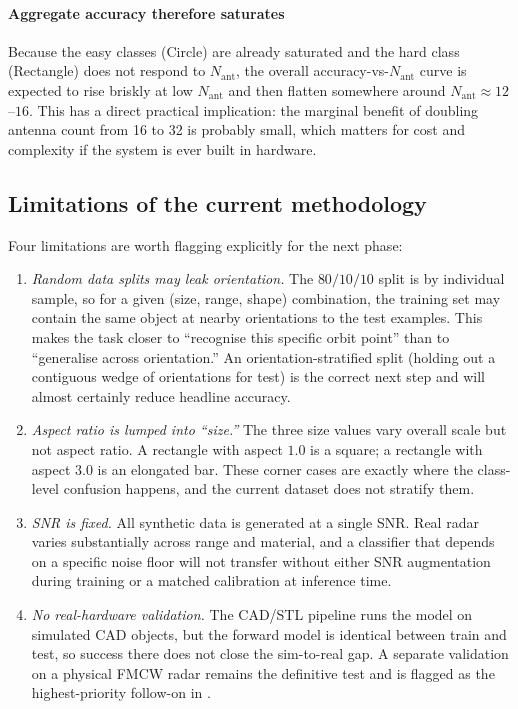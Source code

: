 \documentclass[letterpaper,11pt,leqno]{article}
\begin{document}
\paragraph{Aggregate accuracy therefore saturates} Because the easy classes (Circle) are already saturated and the hard class (Rectangle) does not respond to $N_{\mathrm{ant}}$, the overall accuracy-vs-$N_{\mathrm{ant}}$ curve is expected to rise briskly at low $N_{\mathrm{ant}}$ and then flatten somewhere around $N_{\mathrm{ant}}\approx 12$--$16$. This has a direct practical implication: the marginal benefit of doubling antenna count from 16 to 32 is probably small, which matters for cost and complexity if the system is ever built in hardware.

\subsection{Limitations of the current methodology}

Four limitations are worth flagging explicitly for the next phase:

\begin{enumerate}
\item \emph{Random data splits may leak orientation.} The $80/10/10$ split is by individual sample, so for a given (size, range, shape) combination, the training set may contain the same object at nearby orientations to the test examples. This makes the task closer to ``recognise this specific orbit point'' than to ``generalise across orientation.'' An orientation-stratified split (holding out a contiguous wedge of orientations for test) is the correct next step and will almost certainly reduce headline accuracy.
\item \emph{Aspect ratio is lumped into ``size.''} The three size values vary overall scale but not aspect ratio. A rectangle with aspect $1.0$ is a square; a rectangle with aspect $3.0$ is an elongated bar. These corner cases are exactly where the class-level confusion happens, and the current dataset does not stratify them.
\item \emph{SNR is fixed.} All synthetic data is generated at a single SNR. Real radar varies substantially across range and material, and a classifier that depends on a specific noise floor will not transfer without either SNR augmentation during training or a matched calibration at inference time.
\item \emph{No real-hardware validation.} The CAD/STL pipeline runs the model on simulated CAD objects, but the forward model is identical between train and test, so success there does not close the sim-to-real gap. A separate validation on a physical FMCW radar remains the definitive test and is flagged as the highest-priority follow-on in .
\end{enumerate}
\end{document}
